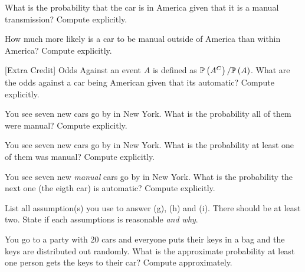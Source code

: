 \documentclass[12pt]{article}
\begin{document}
 What is the probability that the car is in America given that it is a manual transmission? Compute explicitly. 

 How much more likely is a car to be manual outside of America than within America? Compute explicitly. 


 [Extra Credit] Odds Against an event $A$ is defined as $\mathbb{P}\left(A^C\right) / \mathbb{P}\left(A\right)$. What are the odds against a car being American given that its automatic? Compute explicitly. 

 You see seven new cars go by in New York. What is the probability all of them were manual? Compute explicitly. 

 You see seven new cars go by in New York. What is the probability at least one of them was manual? Compute explicitly. 

 You see seven new \textit{manual} cars go by in New York. What is the probability the next one (the eigth car) is automatic? Compute explicitly. 

 List all assumption(s) you use to answer (g), (h) and (i). There should be at least two. State if each assumptions is reasonable \textit{and why}.

 You go to a party with 20 cars and everyone puts their keys in a bag and the keys are distributed out randomly. What is the approximate probability at least one person gets the keys to their car? Compute approximately. 


\eenum
\end{document}
